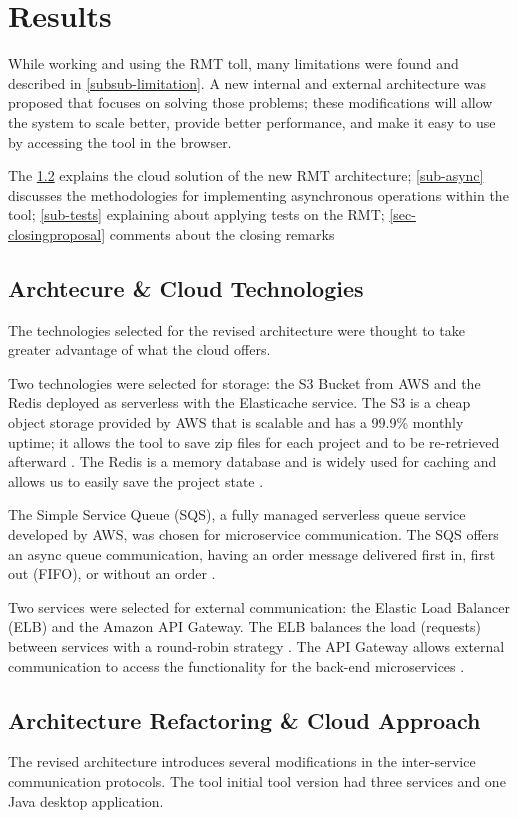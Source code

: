 \chapter{Results}
\label{results}

While working and using the RMT toll, many limitations were found and described in \cref{subsub-limitation}. A new internal and external architecture was proposed that focuses on solving those problems; these modifications will allow the system to scale better, provide better performance, and make it easy to use by accessing the tool in the browser.

The \cref{sec-cloud} explains the cloud solution of the new RMT architecture; \cref{sub-async} discusses the methodologies for implementing asynchronous operations within the tool; \cref{sub-tests} explaining about applying tests on the RMT; \cref{sec-closingproposal} comments about the closing remarks

\section{Archtecure \& Cloud Technologies}

The technologies selected for the revised architecture were thought to take greater advantage of what the cloud offers. 

Two technologies were selected for storage: the S3 Bucket from AWS and the Redis deployed as serverless with the Elasticache service. The S3 is a cheap object storage provided by AWS that is scalable and has a 99.9\% monthly uptime; it allows the tool to save zip files for each project and to be re-retrieved afterward \cite{S3}. The Redis is a memory database and is widely used for caching and allows us to easily save the project state \cite{Redis}.

The Simple Service Queue (SQS), a fully managed serverless queue service developed by AWS, was chosen for microservice communication. The SQS offers an async queue communication, having an order message delivered first in, first out (FIFO), or without an order \cite{sqs}.

Two services were selected for external communication: the Elastic Load Balancer (ELB) and the Amazon API Gateway. The ELB balances the load (requests) between services with a round-robin strategy \cite{Elb}. The API Gateway allows external communication to access the functionality for the back-end microservices \cite{Gateway}.

\section{Architecture Refactoring \& Cloud Approach}
\label{sec-cloud}
The revised architecture introduces several modifications in the inter-service communication protocols. The tool initial tool version had three services and one Java desktop application. 

